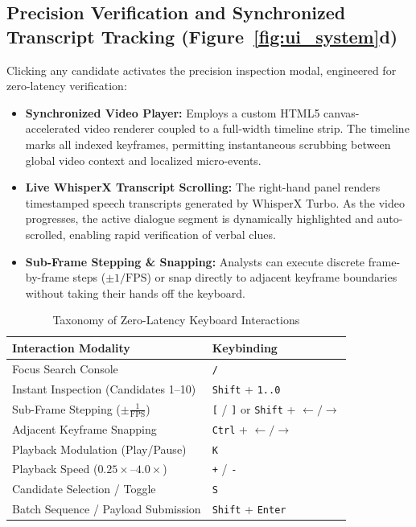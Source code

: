 \subsection{Precision Verification and Synchronized Transcript Tracking (Figure~\ref{fig:ui_system}d)}
Clicking any candidate activates the precision inspection modal, engineered for zero-latency verification:
\begin{itemize}
    \item \textbf{Synchronized Video Player:} Employs a custom HTML5 canvas-accelerated video renderer coupled to a full-width timeline strip. The timeline marks all indexed keyframes, permitting instantaneous scrubbing between global video context and localized micro-events.
    \item \textbf{Live WhisperX Transcript Scrolling:} The right-hand panel renders timestamped speech transcripts generated by WhisperX Turbo. As the video progresses, the active dialogue segment is dynamically highlighted and auto-scrolled, enabling rapid verification of verbal clues.
    \item \textbf{Sub-Frame Stepping \& Snapping:} Analysts can execute discrete frame-by-frame steps ($\pm 1/\text{FPS}$) or snap directly to adjacent keyframe boundaries without taking their hands off the keyboard.
\end{itemize}

\begin{table}[t]
\centering
\caption{Taxonomy of Zero-Latency Keyboard Interactions}
\label{tab:shortcuts}
\begin{tabular}{ll}
\toprule
\textbf{Interaction Modality} & \textbf{Keybinding} \\
\midrule
Focus Search Console & \texttt{/} \\
Instant Inspection (Candidates 1--10) & \texttt{Shift} + \texttt{1..0} \\
Sub-Frame Stepping ($\pm \frac{1}{\text{FPS}}$) & \texttt{[} / \texttt{]} or \texttt{Shift} + $\leftarrow/\rightarrow$ \\
Adjacent Keyframe Snapping & \texttt{Ctrl} + $\leftarrow/\rightarrow$ \\
Playback Modulation (Play/Pause) & \texttt{K} \\
Playback Speed ($0.25\times$--$4.0\times$) & \texttt{+} / \texttt{-} \\
Candidate Selection / Toggle & \texttt{S} \\
Batch Sequence / Payload Submission & \texttt{Shift} + \texttt{Enter} \\
\bottomrule
\end{tabular}
\end{table}

